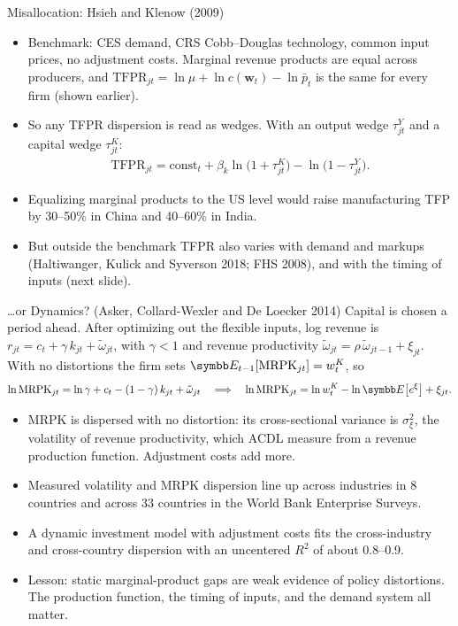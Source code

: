 \documentclass[aspectratio=169,10pt]{beamer}
\begin{document}
\begin{frame}{Misallocation: Hsieh and Klenow (2009)}
\begin{itemize}
\item Benchmark: CES demand, CRS Cobb--Douglas technology, common input prices, no adjustment costs. Marginal revenue products are equal across producers, and $\text{TFPR}_{jt} = \ln\mu + \ln c(\mathbf{w}_t) - \ln \bar p_t$ is the same for every firm (shown earlier).
\item So any TFPR dispersion is read as wedges. With an output wedge $\tau^Y_{jt}$ and a capital wedge $\tau^K_{jt}$:
\begin{align*}
\text{TFPR}_{jt} = \text{const}_t + \beta_k \ln\big(1 + \tau^K_{jt}\big) - \ln\big(1 - \tau^Y_{jt}\big).
\end{align*}
\item Equalizing marginal products to the US level would raise manufacturing TFP by 30--50\% in China and 40--60\% in India.
\item But outside the benchmark TFPR also varies with demand and markups (Haltiwanger, Kulick and Syverson 2018; FHS 2008), and with the timing of inputs (next slide).
\end{itemize}
\end{frame}


\begin{frame}{\ldots or Dynamics? (Asker, Collard-Wexler and De Loecker 2014)}
Capital is chosen a period ahead. After optimizing out the flexible inputs, log revenue is $r_{jt} = c_t + \gamma\, k_{jt} + \tilde\omega_{jt}$, with $\gamma < 1$ and revenue productivity $\tilde\omega_{jt} = \rho\, \tilde\omega_{jt-1} + \xi_{jt}$. With no distortions the firm sets $\E_{t-1}[\text{MRPK}_{jt}] = w^K_t$, so
\begin{align*}
\ln \text{MRPK}_{jt} = \ln\gamma + c_t - (1 - \gamma)\, k_{jt} + \tilde\omega_{jt}
\quad\Longrightarrow\quad
\ln \text{MRPK}_{jt} = \ln w^K_t - \ln \E\big[e^{\xi}\big] + \xi_{jt}.
\end{align*}
\begin{itemize}
\item MRPK is dispersed with \alert{no} distortion: its cross-sectional variance is $\sigma^2_\xi$, the volatility of revenue productivity, which ACDL measure from a revenue production function. Adjustment costs add more.
\item Measured volatility and MRPK dispersion line up across industries in 8 countries and across 33 countries in the World Bank Enterprise Surveys.
\item A dynamic investment model with adjustment costs fits the cross-industry and cross-country dispersion with an uncentered $R^2$ of about 0.8--0.9.
\item Lesson: static marginal-product gaps are weak evidence of policy distortions. The production function, the timing of inputs, and the demand system all matter.
\end{itemize}
\end{frame}
\end{document}
